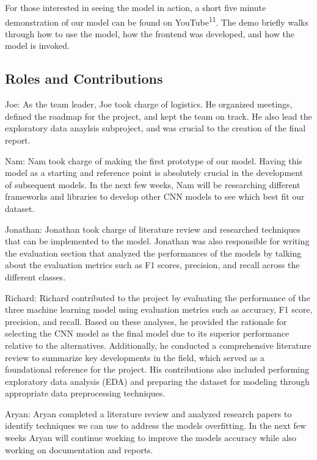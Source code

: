 \documentclass[conference]{IEEEtran}
\begin{document}
For those interested in seeing the model in action, a short five minute demonstration of our model can be found on YouTube\textsuperscript{11}. The demo briefly walks through how to use the model, how the frontend was developed, and how the model is invoked.

\subsection{\large Roles and Contributions}

Joe: As the team leader, Joe took charge of logistics. He organized meetings, defined the roadmap for the project, and kept the team on track. He also lead the exploratory data anaylsis subproject, and was crucial to the creation of the final report. 

Nam: Nam took charge of making the first prototype of our model. Having this model as a starting and reference point is absolutely crucial in the development of subsequent models. In the next few weeks, Nam will be researching different frameworks and libraries to develop other CNN models to see which best fit our dataset.

Jonathan: Jonathan took charge of literature review and researched techniques that can be implemented to the model. Jonathan was also responsible for writing the evaluation section that analyzed the performances of the models by talking about the evaluation metrics such as F1 scores, precision, and recall across the different classes. 

Richard: Richard contributed to the project by evaluating the performance of the three machine learning model using evaluation metrics such as accuracy, F1 score, precision, and recall. Based on these analyses, he provided the rationale for selecting the CNN model as the final model due to its superior performance relative to the alternatives. Additionally, he conducted a comprehensive literature review to summarize key developments in the field, which served as a foundational reference for the project. His contributions also included performing exploratory data analysis (EDA) and preparing the dataset for modeling through appropriate data preprocessing techniques.

Aryan: Aryan completed a literature review and analyzed research papers to identify techniques we can use to address the models overfitting. In the next few weeks Aryan will continue working to improve the models accuracy while also working on documentation and reports. 
\end{document}
